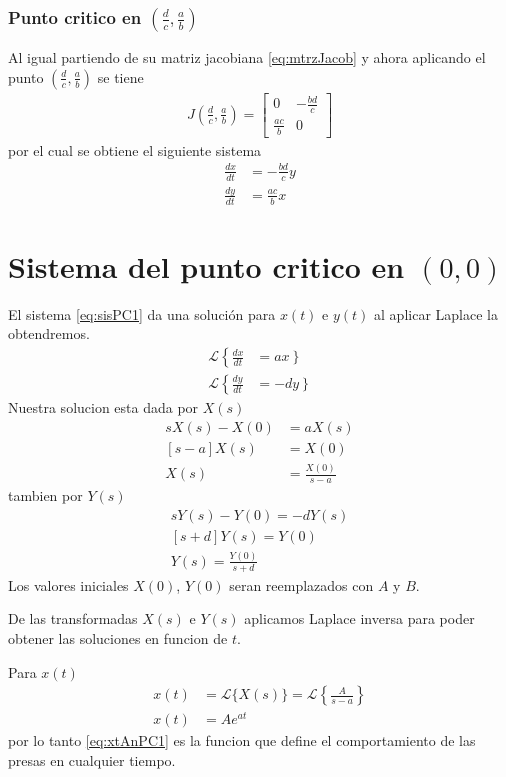 \documentclass{report}
\begin{document}
\subsubsection{Punto critico en $(\frac{d}{c},\frac{a}{b})$}
Al igual partiendo de su matriz jacobiana \ref{eq:mtrzJacob}
y ahora aplicando el punto $(\frac{d}{c},\frac{a}{b})$ se tiene
\begin{align}
J(\frac{d}{c},\frac{a}{b})=
\left[
\begin{matrix}
0 &-\frac{bd}{c}\\
\frac{ac}{b} &0
\end{matrix}\right]
\end{align}
por el cual se obtiene el siguiente sistema
\begin{align}
\frac{dx}{dt}&= -\frac{bd}{c}y \label{eq:sisPC2} \\
\frac{dy}{dt}&= \frac{ac}{b}x \nonumber
\end{align}

\section{Sistema del punto critico en $(0,0)$}
El sistema \ref{eq:sisPC1} da una solución para $x(t)$ e $y(t)$ al aplicar Laplace la obtendremos.
\begin{align*}
\mathcal{L}\left\{\frac{dx}{dt} \right.&= \left. ax\right\} \\
\mathcal{L}\left\{ \frac{dy}{dt}\right.&= \left.-dy \right\}
\end{align*}
Nuestra solucion esta dada por $X(s)$
\begin{align}
sX(s)-X(0)&=aX(s) \nonumber\\
\left[s-a\right]X(s) &=X(0) \\
X(s)&= \frac{X(0)}{s-a} \label{eq:xsLap}
\end{align}
tambien por $Y(s)$
\begin{align}
sY(s)-Y(0)=-dY(s) \nonumber \\
\left[s+d\right]Y(s)=Y(0)\nonumber \\
Y(s)=\frac{Y(0)}{s+d}
 \label{eq:ysLap}
\end{align}
Los valores iniciales $X(0)$, $Y(0)$ seran reemplazados con $A$ y $B$.

De las transformadas $X(s)$ e $Y(s)$ aplicamos Laplace inversa para poder obtener las soluciones en funcion de $t$.

Para $x(t)$
\begin{align}
x(t)&=\mathcal{L}\{X(s)\} =\mathcal{L}\left\{ \frac{A}{s-a}
\right\}\nonumber\\
x(t)&=Ae^{at} \label{eq:xtAnPC1}
\end{align}
por lo tanto \ref{eq:xtAnPC1} es la funcion que define el comportamiento de las presas en cualquier tiempo.
\end{document}
